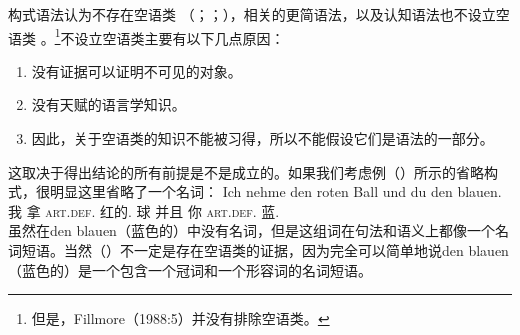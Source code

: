 构式语法认为不存在空语类\indexcxgc\label{Seite-leere-Elemente-CxG} （\citealp[--50]{MR2001a}；\citealp[]{Goldberg2003b}；\citealp[]{Goldberg2006a}），相关的更简语法\citep{CJ2005a}，以及认知语法也不设立空语类 。\footnote{%
  但是，Fillmore（1988:5）并没有排除空语类。
}不设立空语类主要有以下几点原因：
\begin{enumerate}
\item 没有证据可以证明不可见的对象。
\item 没有天赋的语言学知识。
\item 因此，关于空语类的知识不能被习得，所以不能假设它们是语法的一部分。
\end{enumerate}
这取决于得出结论的所有前提是不是成立的。如果我们考虑例（）所示的省略构式，很明显这里省略了一个名词：
\ea
\gll Ich nehme den roten Ball und du den blauen.\\
	 我 拿 \textsc{art}.\textsc{def}.\acc{} 红的.\acc{} 球 并且 你 \textsc{art}.\textsc{def}.\acc{} 蓝.\acc{}\\
\z
虽然在den blauen（蓝色的）中没有名词，但是这组词在句法和语义上都像一个名词短语。当然（）不一定是存在空语类的证据，因为完全可以简单地说den blauen（蓝色的）是一个包含一个冠词和一个形容词的名词短语\citep{Wunderlich87d}。

